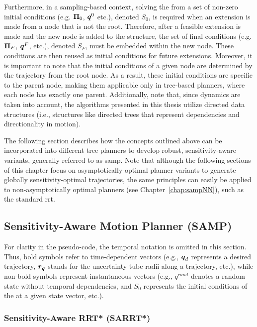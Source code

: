 Furthermore, in a sampling-based context, solving the  from a set of non-zero initial conditions (e.g. $\boldsymbol{\Pi}_0$, $\boldsymbol{q}^0$ etc.), denoted $S_0$, is required when an extension is made from a node that is not the root.
Therefore, after a feasible extension is made and the new node is added to the structure, the set of final conditions (e.g. $\boldsymbol{\Pi}_F$, $\boldsymbol{q}^F$,  etc.), denoted $S_F$, must be embedded within the new node.
These conditions are then reused as initial conditions for future extensions.
Moreover, it is important to note that the initial conditions of a given node are determined by the trajectory from the root node. 
As a result, these initial conditions are specific to the parent node, making them applicable only in tree-based planners, where each node has exactly one parent.
Additionally, note that, since dynamics are taken into account, the algorithms presented in this thesis utilize directed data structures (i.e., structures like directed trees that represent dependencies and directionality in motion).

The following section describes how the concepts outlined above can be incorporated into different tree planners to develop robust, sensitivity-aware variants, generally referred to as \gls{samp}.
Note that although the following sections of this chapter focus on asymptotically-optimal planner variants to generate globally sensitivity-optimal trajectories, the same principles can easily be applied to non-asymptotically optimal planners (see Chapter~\ref{chap:sampNN}), such as the standard \gls{rrt}.
 
\subsection{Sensitivity-Aware Motion Planner (SAMP)}

For clarity in the pseudo-code, the temporal notation is omitted in this section. 
Thus, bold symbols refer to time-dependent vectors (e.g., $\boldsymbol{q}_d$ represents a desired trajectory, $\boldsymbol{r_q}$ stands for the uncertainty tube radii along a trajectory, etc.), while non-bold symbols represent instantaneous vectors (e.g., $q^{rand}$ denotes a random state without temporal dependencies, and $S_0$ represents the initial conditions of the  at a given state vector, etc.).

\subsubsection{Sensitivity-Aware RRT* (SARRT*)}

